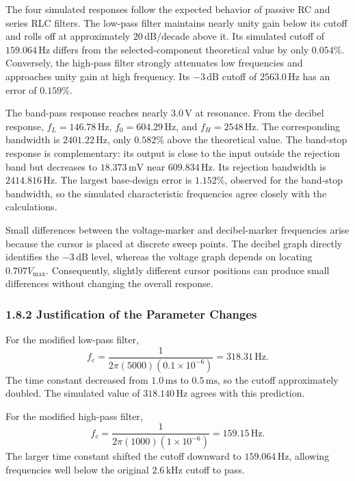 \documentclass[12pt,a4paper]{article}
\begin{document}
The four simulated responses follow the expected behavior of passive RC and series RLC filters. The low-pass filter maintains nearly unity gain below its cutoff and rolls off at approximately $20\,\mathrm{dB/decade}$ above it. Its simulated cutoff of $159.064\,\mathrm{Hz}$ differs from the selected-component theoretical value by only $0.054\%$. Conversely, the high-pass filter strongly attenuates low frequencies and approaches unity gain at high frequency. Its $-3\,\mathrm{dB}$ cutoff of $2563.0\,\mathrm{Hz}$ has an error of $0.159\%$.

The band-pass response reaches nearly $3.0\,\mathrm{V}$ at resonance. From the decibel response, $f_L=146.78\,\mathrm{Hz}$, $f_0=604.29\,\mathrm{Hz}$, and $f_H=2548\,\mathrm{Hz}$. The corresponding bandwidth is $2401.22\,\mathrm{Hz}$, only $0.582\%$ above the theoretical value. The band-stop response is complementary: its output is close to the input outside the rejection band but decreases to $18.373\,\mathrm{mV}$ near $609.834\,\mathrm{Hz}$. Its rejection bandwidth is $2414.816\,\mathrm{Hz}$. The largest base-design error is $1.152\%$, observed for the band-stop bandwidth, so the simulated characteristic frequencies agree closely with the calculations.

Small differences between the voltage-marker and decibel-marker frequencies arise because the cursor is placed at discrete sweep points. The decibel graph directly identifies the $-3\,\mathrm{dB}$ level, whereas the voltage graph depends on locating $0.707V_{\max}$. Consequently, slightly different cursor positions can produce small differences without changing the overall response.

\subsubsection*{1.8.2 Justification of the Parameter Changes}

For the modified low-pass filter,
\begin{equation}
  f_c=\frac{1}{2\pi(5000)(0.1\times10^{-6})}
  =318.31\,\mathrm{Hz}.
  \label{eq:modified-lp-fc}
\end{equation}
The time constant decreased from $1.0\,\mathrm{ms}$ to $0.5\,\mathrm{ms}$, so the cutoff approximately doubled. The simulated value of $318.140\,\mathrm{Hz}$ agrees with this prediction.

For the modified high-pass filter,
\begin{equation}
  f_c=\frac{1}{2\pi(1000)(1\times10^{-6})}
  =159.15\,\mathrm{Hz}.
  \label{eq:modified-hp-fc}
\end{equation}
The larger time constant shifted the cutoff downward to $159.064\,\mathrm{Hz}$, allowing frequencies well below the original $2.6\,\mathrm{kHz}$ cutoff to pass.
\end{document}
